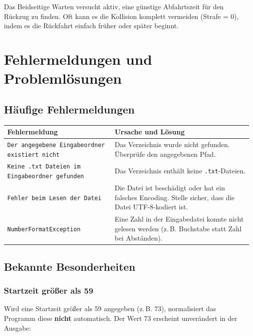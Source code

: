 \documentclass[12pt,a4paper]{article}
\begin{document}
\begin{hinweis}
Das Beidseitige Warten versucht aktiv, eine günstige Abfahrtszeit für den Rückzug zu finden. Oft kann es die Kollision komplett vermeiden (Strafe = 0), indem es die Rückfahrt einfach früher oder später beginnt.
\end{hinweis}

\section{Fehlermeldungen und Problemlösungen}
\label{sec:fehler}

\subsection{Häufige Fehlermeldungen}

\begin{center}
\begin{tabular}{p{5.5cm}p{7.5cm}}
\toprule
\textbf{Fehlermeldung} & \textbf{Ursache und Lösung} \\
\midrule
\texttt{Der angegebene Eingabeordner existiert nicht} & Das Verzeichnis wurde nicht gefunden. Überprüfe den angegebenen Pfad. \\
\texttt{Keine .txt Dateien im Eingabeordner gefunden} & Das Verzeichnis enthält keine \texttt{.txt}-Dateien. \\
\texttt{Fehler beim Lesen der Datei} & Die Datei ist beschädigt oder hat ein falsches Encoding. Stelle sicher, dass die Datei UTF-8-kodiert ist. \\
\texttt{NumberFormatException} & Eine Zahl in der Eingabedatei konnte nicht gelesen werden (z.\,B. Buchstabe statt Zahl bei Abständen). \\
\bottomrule
\end{tabular}
\end{center}

\subsection{Bekannte Besonderheiten}

\subsubsection{Startzeit größer als 59}

Wird eine Startzeit größer als 59 angegeben (z.\,B. 73), normalisiert das Programm diese \textbf{nicht} automatisch. Der Wert 73 erscheint unverändert in der Ausgabe:
\end{document}
